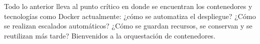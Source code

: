 Todo lo anterior lleva al punto crítico en donde se encuentran los contenedores y
tecnologías como Docker actualmente: ¿cómo se automatiza el despliegue? ¿Cómo se
realizan escalados automáticos? ¿Cómo se guardan recursos, se conservan y se
reutilizan más tarde? Bienvenidos a la orquestación de contenedores.